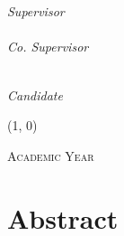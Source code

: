 \documentclass[
  10pt,       %
  twoside,    %
  a4paper,    %
  english,    %
  tikz,       %
  openright,  %
]{book}
\begin{document}
\begin{titlepage}
\begin{center}
    \begin{large}
      \textsc{\myFaculty}\\
    \end{large}

    \vspace{30pt}

    \begin{LARGE}
      {\color{unipdred}\textbf{\myTitle}}\\
    \end{LARGE}

    \vfill

    \begin{large}
      \begin{flushleft}
        \textit{Supervisor}\\
        \vspace{5pt}
        \profTitle\ \myProf\\
        \vspace{20pt}
        \textit{Co. Supervisor}\\
        \vspace{5pt}
        \profTitle\ \myCoProf\\
      \end{flushleft}

      \vspace{-55pt}

      \begin{flushright}
        \textit{Candidate}\\
        \vspace{5pt}
        \myName
      \end{flushright}
    \end{large}


    \line(1, 0){\textwidth} \\
    \begin{normalsize}
      \textsc{Academic Year \myAA}
    \end{normalsize}
  \end{center}
\end{titlepage}
\cleardoublepage
{}
{}
\begingroup

\chapter*{Abstract}
\end{document}
